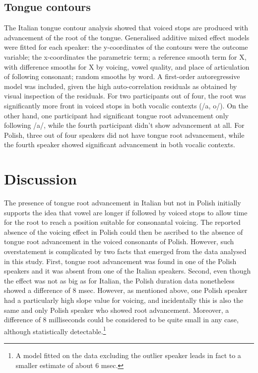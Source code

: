\documentclass[]{elsarticle}
\begin{document}
\subsection{Tongue contours}\label{tongue-contours}

The Italian tongue contour analysis showed that voiced stops are
produced with advancement of the root of the tongue. Generalised
additive mixed effect models were fitted for each speaker: the
y-coordinates of the contours were the outcome variable; the
x-coordinates the parametric term; a reference smooth term for X, with
difference smooths for X by voicing, vowel quality, and place of
articulation of following consonant; random smooths by word. A
first-order autoregressive model was included, given the high
auto-correlation residuals as obtained by visual inspection of the
residuals. For two participants out of four, the root was significantly
more front in voiced stops in both vocalic contexts (/a, o/). On the
other hand, one participant had significant tongue root advancement only
following /a/, while the fourth participant didn't show advancement at
all. For Polish, three out of four speakers did not have tongue root
advancement, while the fourth speaker showed significant advancement in
both vocalic contexts.

\section{Discussion}\label{discussion}

The presence of tongue root advancement in Italian but not in Polish
initially supports the idea that vowel are longer if followed by voiced
stops to allow time for the root to reach a position suitable for
consonantal voicing. The reported absence of the voicing effect in
Polish could then be ascribed to the absence of tongue root advancement
in the voiced consonants of Polish. However, such overstatement is
complicated by two facts that emerged from the data analysed in this
study. First, tongue root advancement was found in one of the Polish
speakers and it was absent from one of the Italian speakers. Second,
even though the effect was not as big as for Italian, the Polish
duration data nonetheless showed a difference of 8 msec. However, as
mentioned above, one Polish speaker had a particularly high slope value
for voicing, and incidentally this is also the same and only Polish
speaker who showed root advancement. Moreover, a difference of 8
milliseconds could be considered to be quite small in any case, although
statistically
detectable.\footnote{A model fitted on the data excluding the outlier speaker leads in fact to a smaller estimate of about 6 msec.}


\end{document}
